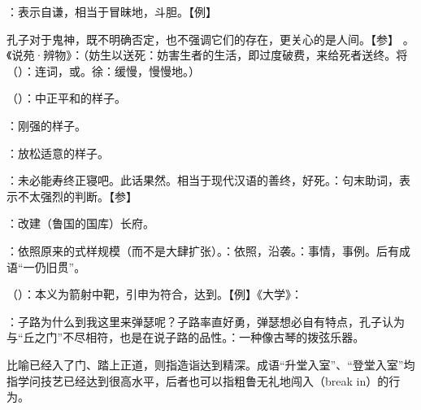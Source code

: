 {
\begin{lyitemize}
\item {}：表示自谦，相当于冒昧地，斗胆。【例】 
\end{lyitemize}
孔子对于鬼神，既不明确否定，也不强调它们的存在，更关心的是人间。【参】 。《说苑·辨物》：（妨生以送死：妨害生者的生活，即过度破费，来给死者送终。将（）：连词，或。徐：缓慢，慢慢地。）
}
{}  %


{
\item {}（）：中正平和的样子。
\item {}：刚强的样子。
\item {}：放松适意的样子。
\item {}：未必能寿终正寝吧。此话果然。相当于现代汉语的善终，好死。：句末助词，表示不太强烈的判断。【参】
}
{}


{
\item {}：改建（鲁国的国库）长府。
\item {}：依照原来的式样规模（而不是大肆扩张）。：依照，沿袭。：事情，事例。后有成语“一仍旧贯”。
\item {}（）：本义为箭射中靶，引申为符合，达到。【例】《大学》：
}
{}


{
\item {}：子路为什么到我这里来弹瑟呢？子路率直好勇，弹瑟想必自有特点，孔子认为与“丘之门”不尽相符，也是在说子路的品性。：一种像古琴的拨弦乐器。
\item {}比喻已经入了门、踏上正道，则指造诣达到精深。成语“升堂入室”、“登堂入室”均指学问技艺已经达到很高水平，后者也可以指粗鲁无礼地闯入（break in）的行为。
}
{}


